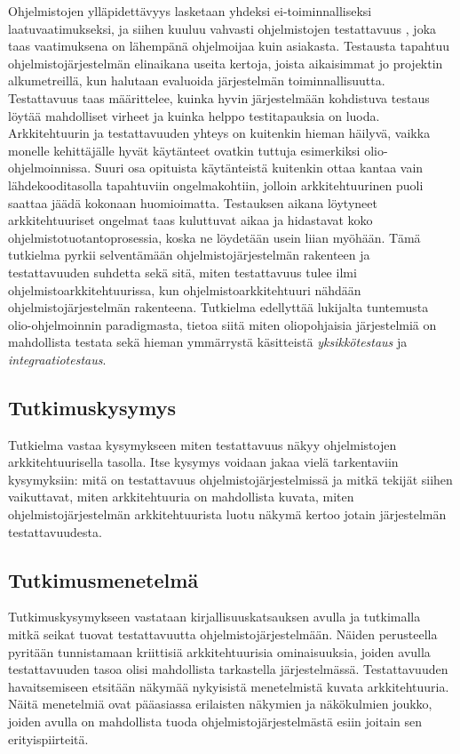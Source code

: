 \documentclass[finnish]{tktltiki2}
\numberwithin{table}{section}
\theoremstyle{definition}
\theoremstyle{remark}
\begin{document}
Ohjelmistojen ylläpidettävyys lasketaan yhdeksi ei-toiminnalliseksi laatuvaatimukseksi, ja siihen kuuluu vahvasti ohjelmistojen testattavuus \citep{ISO/IEC25010:2011}, joka taas vaatimuksena on lähempänä ohjelmoijaa kuin asiakasta. Testausta tapahtuu ohjelmistojärjestelmän elinaikana useita kertoja, joista  aikaisimmat jo projektin alkumetreillä, kun halutaan evaluoida järjestelmän toiminnallisuutta. Testattavuus taas määrittelee, kuinka hyvin järjestelmään kohdistuva testaus löytää mahdolliset virheet ja kuinka helppo testitapauksia on luoda. Arkkitehtuurin ja testattavuuden yhteys on kuitenkin hieman häilyvä, vaikka monelle kehittäjälle hyvät käytänteet ovatkin tuttuja esimerkiksi olio-ohjelmoinnissa. Suuri osa opituista käytänteistä kuitenkin ottaa kantaa vain lähdekooditasolla tapahtuviin ongelmakohtiin, jolloin arkkitehtuurinen puoli saattaa jäädä kokonaan huomioimatta. Testauksen aikana löytyneet arkkitehtuuriset ongelmat taas kuluttuvat aikaa ja hidastavat koko ohjelmistotuotantoprosessia, koska ne löydetään usein liian myöhään. Tämä tutkielma pyrkii selventämään ohjelmistojärjestelmän rakenteen ja testattavuuden suhdetta sekä sitä, miten testattavuus tulee ilmi ohjelmistoarkkitehtuurissa, kun ohjelmistoarkkitehtuuri nähdään ohjelmistojärjestelmän rakenteena. Tutkielma edellyttää lukijalta tuntemusta olio-ohjelmoinnin paradigmasta, tietoa siitä miten oliopohjaisia järjestelmiä on mahdollista testata sekä hieman ymmärrystä käsitteistä \textit{yksikkötestaus} ja \textit{integraatiotestaus}. 

\subsection{Tutkimuskysymys}
Tutkielma vastaa kysymykseen miten testattavuus näkyy ohjelmistojen arkkitehtuurisella tasolla. Itse kysymys voidaan jakaa vielä tarkentaviin kysymyksiin: mitä on testattavuus ohjelmistojärjestelmissä ja mitkä tekijät siihen vaikuttavat, miten arkkitehtuuria on mahdollista kuvata, miten ohjelmistojärjestelmän arkkitehtuurista luotu näkymä kertoo jotain järjestelmän testattavuudesta. 

\subsection{Tutkimusmenetelmä}
Tutkimuskysymykseen vastataan kirjallisuuskatsauksen avulla ja tutkimalla mitkä seikat tuovat testattavuutta ohjelmistojärjestelmään. Näiden perusteella pyritään tunnistamaan kriittisiä arkkitehtuurisia ominaisuuksia, joiden avulla testattavuuden tasoa olisi mahdollista tarkastella järjestelmässä. Testattavuuden havaitsemiseen etsitään näkymää nykyisistä menetelmistä kuvata arkkitehtuuria. Näitä menetelmiä ovat pääasiassa erilaisten näkymien ja näkökulmien joukko, joiden avulla on mahdollista tuoda ohjelmistojärjestelmästä esiin joitain sen erityispiirteitä.
\end{document}
